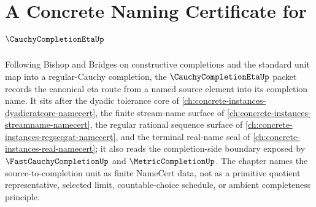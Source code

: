 \chapter{A Concrete Naming Certificate for $\CauchyCompletionEtaUp$}
\label{ch:concrete-instances-cauchy-completion-eta-namecert}

Following Bishop and Bridges on constructive completions and the standard unit map into a regular-Cauchy completion, the $\CauchyCompletionEtaUp$ packet records the canonical eta route from a named source element into its completion name. It sits after the dyadic tolerance core of \autoref{ch:concrete-instances-dyadicratcore-namecert}, the finite stream-name surface of \autoref{ch:concrete-instances-streamname-namecert}, the regular rational sequence surface of \autoref{ch:concrete-instances-regseqrat-namecert}, and the terminal real-name seal of \autoref{ch:concrete-instances-real-namecert}; it also reads the completion-side boundary exposed by $\FastCauchyCompletionUp$ and $\MetricCompletionUp$. The chapter names the source-to-completion unit as finite NameCert data, not as a primitive quotient representative, selected limit, countable-choice schedule, or ambient completeness principle.

